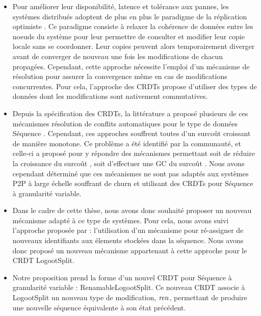 \begin{itemize}
    \item Pour améliorer leur disponibilité, latence et tolérance aux pannes, les systèmes distribués adoptent de plus en plus le paradigme de la réplication optimiste \cite{2005-optimistic-replication-saito}.
        Ce paradigme consiste à relaxer la cohérence de données entre les noeuds du système pour leur permettre de consulter et modifier leur copie locale sans se coordonner.
        Leur copies peuvent alors temporairement diverger avant de converger de nouveau une fois les modifications de chacun propagées.
        Cependant, cette approche nécessite l'emploi d'un mécanisme de résolution pour assurer la convergence même en cas de modifications concurrentes.
        Pour cela, l'approche des \acp{CRDT} \cite{2007-crdt-shapiro,shapiro_2011_crdt} propose d'utiliser des types de données dont les modifications sont nativement commutatives.
    \item Depuis la spécification des \acp{CRDT}, la littérature a proposé plusieurs de ces mécanismes résolution de conflits automatiques pour le type de données Séquence \cite{2006-woot-oster,ROH2011354,2009-treedoc-preguica,2009-logoot-weiss}.
        Cependant, ces approches souffrent toutes d'un surcoût croissant de manière monotone.
        Ce problème a été identifié par la communauté, et celle-ci a proposé pour y répondre des mécanismes permettant soit de réduire la croissance du surcoût \cite{lseq2013,lseq2017}, soit d'effectuer une \ac{GC} du surcoût \cite{ROH2011354,letia:hal-01248270,zawirski:hal-01248197}.
        Nous avons cependant déterminé que ces mécanismes ne sont pas adaptés aux systèmes \ac{P2P} à large échelle souffrant de churn et utilisant des \acp{CRDT} pour Séquence à granularité variable.
    \item Dans le cadre de cette thèse, nous avons donc souhaité proposer un nouveau mécanisme adapté à ce type de systèmes.
        Pour cela, nous avons suivi l'approche proposée par \cite{letia:hal-01248270,zawirski:hal-01248197} : l'utilisation d'un mécanisme pour ré-assigner de nouveaux identifiants aux élements stockées dans la séquence.
        Nous avons donc proposé un nouveau mécanisme appartenant à cette approche pour le \ac{CRDT} LogootSplit.
    \item Notre proposition prend la forme d'un nouvel \ac{CRDT} pour Séquence à granularité variable : RenamableLogootSplit.
        Ce nouveau \ac{CRDT} associe à LogootSplit un nouveau type de modification, $\mathit{ren}$, permettant de produire une nouvelle séquence équivalente à son état précédent.

\end{itemize}

